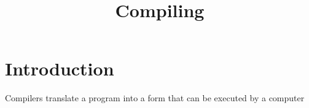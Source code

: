 \documentclass{blog}
\title{Compiling}
\begin{document}
\maketitle
\tableofcontents
\section{Introduction}
\begin{definition}[compile]
    Compilers translate a program into a form that can be executed by a computer \cite{AHO_2007_COMPILERS_PRINCIPLES_TECHNIQUES_AND_TOOLS}
\end{definition}

\printbibliography
\end{document}
